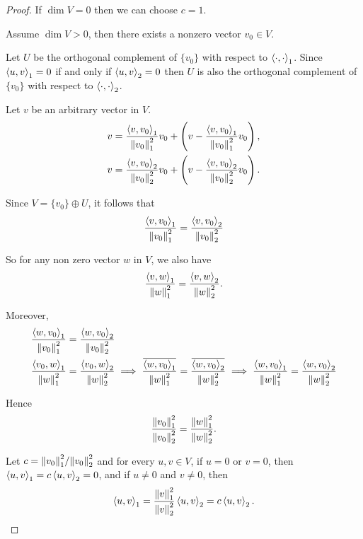 \begin{proof}
    If $\dim V = 0$ then we can choose $c = 1$.

    Assume $\dim V > 0$, then there exists a nonzero vector $v_{0}\in V$.

    Let $U$ be the orthogonal complement of $\{v_{0}\}$ with respect to $\left\langle{\cdot, \cdot}\right\rangle_{1}$. Since $\left\langle{u, v}\right\rangle_{1} = 0$ if and only if $\left\langle{u, v}\right\rangle_{2} = 0$ then $U$ is also the orthogonal complement of $\{v_{0}\}$ with respect to $\left\langle{\cdot, \cdot}\right\rangle_{2}$.

    Let $v$ be an arbitrary vector in $V$.
    \[
        \begin{split}
            v = \frac{\left\langle{v, v_{0}}\right\rangle_{1}}{\left\Vert{v_{0}}\right\Vert_{1}^{2}}v_{0} + \left( v - \frac{\left\langle{v, v_{0}}\right\rangle_{1}}{\left\Vert{v_{0}}\right\Vert_{1}^{2}}v_{0} \right), \\
            v = \frac{\left\langle{v, v_{0}}\right\rangle_{2}}{\left\Vert{v_{0}}\right\Vert_{2}^{2}}v_{0} + \left( v - \frac{\left\langle{v, v_{0}}\right\rangle_{2}}{\left\Vert{v_{0}}\right\Vert_{2}^{2}}v_{0} \right).
        \end{split}
    \]


    Since $V = \{ v_{0} \} \oplus U$, it follows that
    \[
        \frac{\left\langle{v, v_{0}}\right\rangle_{1}}{\left\Vert{v_{0}}\right\Vert_{1}^{2}} = \frac{\left\langle{v, v_{0}}\right\rangle_{2}}{\left\Vert{v_{0}}\right\Vert_{2}^{2}}
    \]

    So for any non zero vector $w$ in $V$, we also have
    \[
        \frac{\left\langle{v, w}\right\rangle_{1}}{\left\Vert{w}\right\Vert_{1}^{2}} = \frac{\left\langle{v, w}\right\rangle_{2}}{\left\Vert{w}\right\Vert_{2}^{2}}.
    \]

    Moreover,
    \begin{align*}
        \frac{\left\langle{w, v_{0}}\right\rangle_{1}}{\left\Vert{v_{0}}\right\Vert_{1}^{2}} & = \frac{\left\langle{w, v_{0}}\right\rangle_{2}}{\left\Vert{v_{0}}\right\Vert_{2}^{2}}                                                                                                                                                                                                                                         \\
        \frac{\left\langle{v_{0}, w}\right\rangle_{1}}{\left\Vert{w}\right\Vert_{1}^{2}}     & = \frac{\left\langle{v_{0}, w}\right\rangle_{2}}{\left\Vert{w}\right\Vert_{2}^{2}} \implies \frac{\overline{\left\langle{w, v_{0}}\right\rangle_{1}}}{\left\Vert{w}\right\Vert_{1}^{2}} = \frac{\overline{\left\langle{w, v_{0}}\right\rangle_{2}}}{\left\Vert{w}\right\Vert_{2}^{2}} \implies \frac{\left\langle{w, v_{0}}\right\rangle_{1}}{\left\Vert{w}\right\Vert_{1}^{2}} = \frac{\left\langle{w, v_{0}}\right\rangle_{2}}{\left\Vert{w}\right\Vert_{2}^{2}}
    \end{align*}

    Hence
    \[
        \frac{\left\Vert{v_{0}}\right\Vert_{1}^{2}}{\left\Vert{v_{0}}\right\Vert_{2}^{2}} = \frac{\left\Vert{w}\right\Vert_{1}^{2}}{\left\Vert{w}\right\Vert_{2}^{2}}.
    \]

    Let $c = {\left\Vert{v_{0}}\right\Vert_{1}^{2}}/{\left\Vert{v_{0}}\right\Vert_{2}^{2}}$ and for every $u, v\in V$, if $u = 0$ or $v = 0$, then $\left\langle{u, v}\right\rangle_{1} = c\left\langle{u, v}\right\rangle_{2} = 0$, and if $u\ne 0$ and $v\ne 0$, then
    \[
        \left\langle{u, v}\right\rangle_{1} = \frac{\left\Vert{v}\right\Vert_{1}^{2}}{\left\Vert{v}\right\Vert_{2}^{2}}\left\langle{u, v}\right\rangle_{2} = c\left\langle{u, v}\right\rangle_{2}.
    \]
\end{proof}
\newpage

